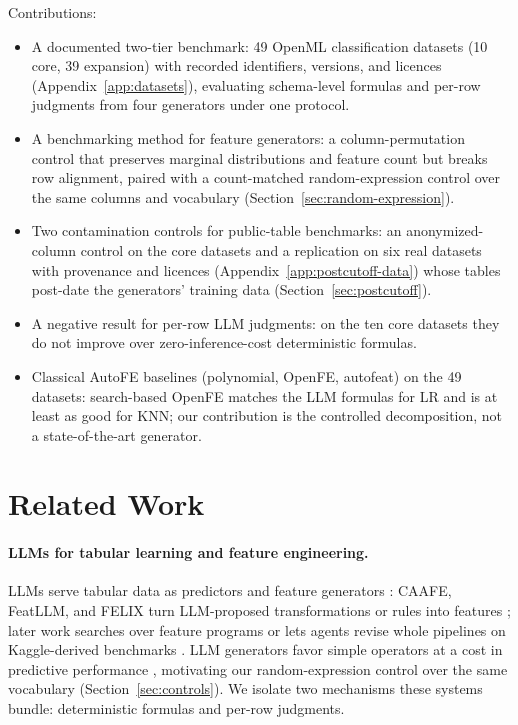Contributions:

\begin{itemize}
\item
  A documented two-tier benchmark: 49 OpenML classification datasets (10 core, 39 expansion) with recorded identifiers, versions, and licences (Appendix~\ref{app:datasets}), evaluating schema-level formulas and per-row judgments from four generators under one protocol.
\item
  A benchmarking method for feature generators: a column-permutation control that preserves marginal distributions and feature count but breaks row alignment, paired with a count-matched random-expression control over the same columns and vocabulary (Section~\ref{sec:random-expression}).
\item
  Two contamination controls for public-table benchmarks: an anonymized-column control on the core datasets and a replication on six real datasets with provenance and licences (Appendix~\ref{app:postcutoff-data}) whose tables post-date the generators' training data (Section~\ref{sec:postcutoff}).
\item
  A negative result for per-row LLM judgments: on the ten core datasets they do not improve over zero-inference-cost deterministic formulas.
\item
  Classical AutoFE baselines (polynomial, OpenFE, autofeat) on the 49 datasets: search-based OpenFE matches the LLM formulas for LR and is at least as good for KNN; our contribution is the controlled decomposition, not a state-of-the-art generator.
\end{itemize}

\section{Related Work}\label{sec:related-work}

\paragraph{LLMs for tabular learning and feature engineering.}

LLMs serve tabular data as predictors and feature generators \citep{fang2024survey,hegselmann2023tabllm}: CAAFE, FeatLLM, and FELIX turn LLM-proposed transformations or rules into features \citep{hollmann2023caafe,han2024featllm,malberg2024felix}; later work searches over feature programs \citep{nam2024octree,abhyankar2026llmfe,gong2025evolutionary,zhang2025dynamic} or lets agents revise whole pipelines on Kaggle-derived benchmarks \citep{guo2024dsagent,hong2025datainterpreter,chi2024sela,jiang2025aide,li2024autokaggle,chan2025mlebench}. LLM generators favor simple operators at a cost in predictive performance \citep{kuken2024simple}, motivating our random-expression control over the same vocabulary (Section~\ref{sec:controls}). We isolate two mechanisms these systems bundle: deterministic formulas and per-row judgments.

